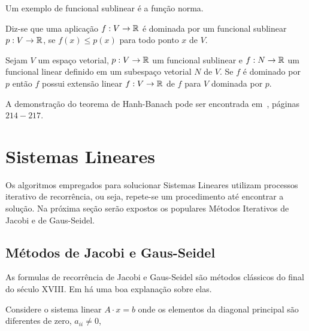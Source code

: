 \documentclass[glenn,refnum,codigo]{Estilo}
\begin{document}
\begin{exemplo}
	Um exemplo de funcional sublinear é a função norma.
\end{exemplo}


\begin{define}
	Diz-se que uma aplicação $f: V \rightarrow \mathbb{R}$ é dominada por um funcional
	sublinear $p: V \rightarrow \mathbb{R}$, se $f(x) \leqslant p(x)$ para todo ponto $x$ de $V$.
\end{define}

\begin{teorema}
	Sejam $V$ um espaço vetorial, $p: V \rightarrow \mathbb{R}$ um funcional sublinear e $f: N \rightarrow \mathbb{R}$ um
	funcional linear definido em um subespaço vetorial $N$ de $V$.
	Se $f$ é dominado por $p$ então $f$ possui extensão linear $f: V \rightarrow \mathbb{R}$ de $f$ para $V$ dominada por $p$.
\end{teorema}


\begin{prova}
	A demonstração do teorema de Hanh-Banach  pode ser encontrada em~\cite{kreyszig},
	páginas $214-217$.
\end{prova}

\chapter{Sistemas Lineares}

Os algoritmos empregados para solucionar Sistemas Lineares utilizam processos iterativo
de recorrência, ou seja, repete-se um procedimento até encontrar a solução. Na próxima seção
serão expostos os populares Métodos Iterativos de Jacobi e de Gaus-Seidel.

\section{Métodos de Jacobi e Gaus-Seidel}\label{mi}

As formulas de recorrência de Jacobi e Gaus-Seidel são métodos clássicos do final do século XVIII. Em \cite{saad}
há uma boa explanação sobre elas.


Considere o sistema linear $A \cdot x=b$ onde os elementos da diagonal principal são diferentes de zero, $a_{ii}\neq 0$,
\end{document}
